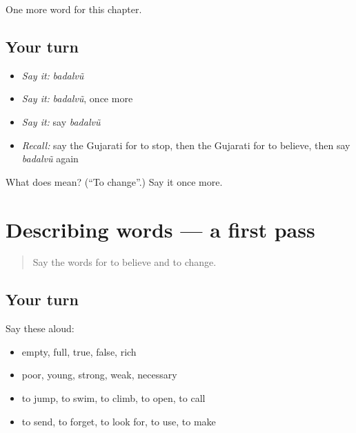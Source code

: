 \begin{grammarlens}[title={What you've built}]
One more word for this chapter.
\end{grammarlens}

\subsection*{Your turn}
\begin{itemize}
\raggedright
  \item \emph{Say it:} \emph{badalvũ}
  \item \emph{Say it:} \emph{badalvũ}, once more
  \item \emph{Say it:} say \emph{badalvũ}
  \item \emph{Recall:} say the Gujarati for to stop, then the Gujarati for to believe, then say \emph{badalvũ} again
\end{itemize}

\begin{tcolorbox}[breakable,colback=teal!4,colframe=teal!35!black,title={Before you move on}]
What does  mean? (\textquotedblleft{}To change\textquotedblright{}.) Say it once more.
\end{tcolorbox}
\section[(dialogue)]{Describing words — a first pass}

\label{lesson:GU-R143-first-pass-describing-words}



\begin{quote}
Say the words for to believe and to change.
\end{quote}

\subsection*{Your turn}
Say these aloud:

\begin{itemize}
\raggedright
  \item empty, full, true, false, rich
  \item poor, young, strong, weak, necessary
  \item to jump, to swim, to climb, to open, to call
  \item to send, to forget, to look for, to use, to make
\end{itemize}

